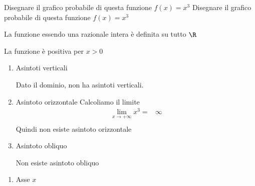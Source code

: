 \begin{exercise}
	Disegnare il grafico probabile di questa funzione $f(x)=x^3$
	\tcblower
	Disegnare il grafico probabile di questa funzione $f(x)=x^3$
		\begin{itemize}

		La funzione essendo una razionale intera è definita su tutto  $\R$
		
La funzione è positiva per $x>0$
		
		\begin{enumerate}
			\item Asintoti verticali
			
			Dato il dominio, non ha asintoti verticali.
			
			\item Asintoto orizzontale 
				Calcoliamo il limite
		\begin{align*}
		\lim_{x\to +\infty}x^3=&\infty\\
		\end{align*}
		Quindi non esiste asintoto orizzontale
		\item Asintoto obliquo
		
		Non esiste asintoto obliquo
			
		\end{enumerate}
		\begin{enumerate}
			\item Asse $x$
					

\end{enumerate}
\end{itemize}
\end{exercise}
